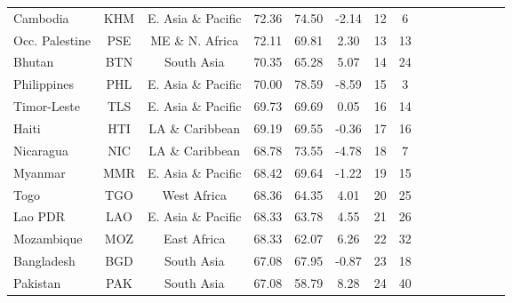 {\begin{longtable}{lcccccccccccccc}
Cambodia                          & KHM           & E. Asia \& Pacific & 72.36             & 74.50               & -2.14              & 12            & 6               \\
Occ. Palestine & PSE & ME \& N. Africa & 72.11 & 69.81 & 2.30 & 13 & 13 \\
Bhutan                            & BTN           & South Asia         & 70.35             & 65.28               & 5.07               & 14            & 24              \\
Philippines                       & PHL           & E. Asia \& Pacific & 70.00             & 78.59               & -8.59              & 15            & 3               \\
Timor-Leste                       & TLS           & E. Asia \& Pacific & 69.73             & 69.69               & 0.05               & 16            & 14              \\
Haiti                             & HTI           & LA \& Caribbean    & 69.19             & 69.55               & -0.36              & 17            & 16              \\
Nicaragua                         & NIC           & LA \& Caribbean    & 68.78             & 73.55               & -4.78              & 18            & 7               \\
Myanmar                           & MMR           & E. Asia \& Pacific & 68.42             & 69.64               & -1.22              & 19            & 15              \\
Togo                              & TGO           & West Africa        & 68.36             & 64.35               & 4.01               & 20            & 25              \\
Lao PDR  & LAO           & E. Asia \& Pacific & 68.33             & 63.78               & 4.55               & 21            & 26              \\
Mozambique                        & MOZ           & East Africa        & 68.33             & 62.07               & 6.26               & 22            & 32              \\
Bangladesh                        & BGD           & South Asia         & 67.08             & 67.95               & -0.87              & 23            & 18              \\
Pakistan                          & PAK           & South Asia         & 67.08             & 58.79               & 8.28               & 24            & 40              \\

\end{longtable}}
